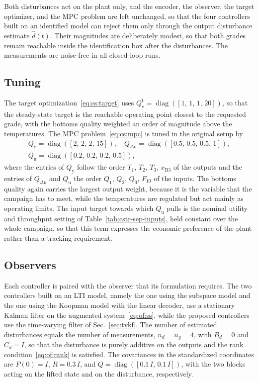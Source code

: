 \documentclass[preprint,12pt,authoryear]{elsarticle}
\theoremstyle{remark}
\DeclareMathOperator{\diag}{diag}
\newcommand{\ui}[2]{#1_{\text{#2}}}
\begin{document}
Both disturbances act on the plant only, and the encoder, the observer, the target optimizer, and the MPC problem are left unchanged, so that the four controllers built on an identified model can reject them only through the output disturbance estimate $\hat{d}(t)$. Their magnitudes are deliberately modest, so that both grades remain reachable inside the identification box after the disturbances. The measurements are noise-free in all closed-loop runs.


\subsection{Tuning}

The target optimization~\eqref{eq:cs:target} uses $\ui{Q}{y}^\text{t} = \diag([1,\, 1,\, 1,\, 20])$, so that the steady-state target is the reachable operating point closest to the requested grade, with the bottoms quality weighted an order of magnitude above the temperatures. The MPC problem~\eqref{eq:cs:mpc} is tuned in the original setup by
\begin{equation}
  \label{eq:cl:weights}
  \begin{gathered}
    \ui{Q}{y} = \diag([2,\, 2,\, 2,\, 15]), \quad
    Q_{\Delta\text{u}} = \diag([0.5,\, 0.5,\, 0.5,\, 1]), \\
    \ui{Q}{u} = \diag([0.2,\, 0.2,\, 0.2,\, 0.5]),
  \end{gathered}
\end{equation}
where the entries of $\ui{Q}{y}$ follow the order $T_1$, $T_2$, $T_3$, $x_{\text{B}3}$ of the outputs and the entries of $Q_{\Delta\text{u}}$ and $\ui{Q}{u}$ the order $Q_1$, $Q_2$, $Q_3$, $F_{10}$ of the inputs. The bottoms quality again carries the largest output weight, because it is the variable that the campaign has to meet, while the temperatures are regulated but act mainly as operating limits. The input target towards which $\ui{Q}{u}$ pulls is the nominal utility and throughput setting of Table~\ref{tab:cstr-sep-inputs}, held constant over the whole campaign, so that this term expresses the economic preference of the plant rather than a tracking requirement.

\subsection{Observers}

Each controller is paired with the observer that its formulation requires. The two controllers built on an LTI model, namely the one using the subspace model and the one using the Koopman model with the linear decoder, use a stationary Kalman filter on the augmented system~\eqref{eq:of:ss}, while the proposed controllers use the time-varying filter of Sec.~\ref{sec:tvkf}. The number of estimated disturbances equals the number of measurements, $n_d = n_y = 4$, with $B_d = 0$ and $C_d = I$, so that the disturbance is purely additive on the outputs and the rank condition~\eqref{eq:of:rank} is satisfied. The covariances in the standardized coordinates are $P(0) = I$, $R = 0.3\,I$, and $Q = \diag([0.1\,I,\, 0.1\,I])$, with the two blocks acting on the lifted state and on the disturbance, respectively.
\end{document}
